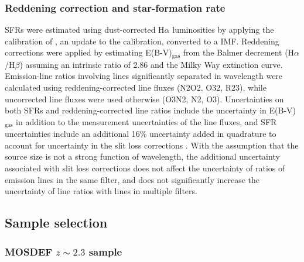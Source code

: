 \documentclass[iop,twocolappendix]{emulateapj}
\begin{document}
\subsubsection{Reddening correction and star-formation rate}

SFRs were estimated using dust-corrected H$\alpha$ luminosities by applying
 the calibration of \citet{hao11}, an update to the \citet{ken98} calibration, converted to
 a \citet{cha03} IMF.  Reddening corrections were applied by estimating E(B-V)$_{\text{gas}}$
 from the Balmer decrement (H$\alpha$/H$\beta$) assuming an intrinsic ratio of 2.86 and the
 \citet{car89} Milky Way extinction curve.  Emission-line ratios involving lines
 significantly separated in wavelength were calculated using reddening-corrected line fluxes (N2O2, O32, R23),
 while uncorrected line fluxes were used otherwise (O3N2, N2, O3).
  Uncertainties on both SFRs and reddening-corrected line ratios include the uncertainty in
 E(B-V)$_{\text{gas}}$ in addition to the measurement uncertainties of the line fluxes,
 and SFR uncertainties include an additional 16\% uncertainty added in quadrature to
 account for uncertainty in the slit loss corrections \citep{kri15}.
  With the assumption that the source size is not a strong function of wavelength, the additional
 uncertainty associated with slit loss corrections does not affect the uncertainty of ratios of emission
 lines in the same filter, and does not significantly increase the uncertainty of line ratios with lines
 in multiple filters.

\subsection{Sample selection}

\subsubsection{MOSDEF $z\sim2.3$ sample}
\end{document}
